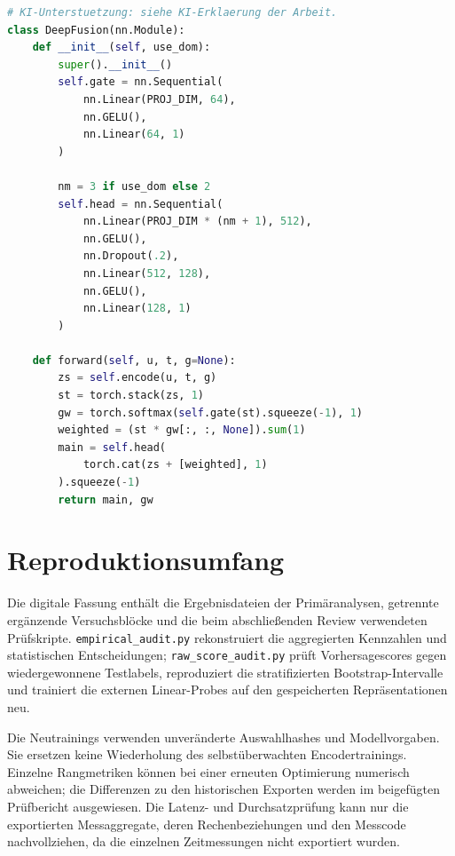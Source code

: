 \par\medskip\noindent\begin{minipage}{\dimexpr\linewidth-1em\relax}
\begin{lstlisting}[language=Python,caption={Kern der multimodalen DUAL-/TRI-Fusion -- gekürzter Architekturausschnitt},label={lst:deep_fusion}]
# KI-Unterstuetzung: siehe KI-Erklaerung der Arbeit.
class DeepFusion(nn.Module):
    def __init__(self, use_dom):
        super().__init__()
        self.gate = nn.Sequential(
            nn.Linear(PROJ_DIM, 64),
            nn.GELU(),
            nn.Linear(64, 1)
        )

        nm = 3 if use_dom else 2
        self.head = nn.Sequential(
            nn.Linear(PROJ_DIM * (nm + 1), 512),
            nn.GELU(),
            nn.Dropout(.2),
            nn.Linear(512, 128),
            nn.GELU(),
            nn.Linear(128, 1)
        )

    def forward(self, u, t, g=None):
        zs = self.encode(u, t, g)
        st = torch.stack(zs, 1)
        gw = torch.softmax(self.gate(st).squeeze(-1), 1)
        weighted = (st * gw[:, :, None]).sum(1)
        main = self.head(
            torch.cat(zs + [weighted], 1)
        ).squeeze(-1)
        return main, gw
\end{lstlisting}
\end{minipage}\par\medskip

\section{Reproduktionsumfang}
Die digitale Fassung enthält die Ergebnisdateien der Primäranalysen, getrennte ergänzende
Versuchsblöcke und die beim abschließenden Review verwendeten Prüfskripte.
\nolinkurl{empirical_audit.py} rekonstruiert die aggregierten Kennzahlen und statistischen
Entscheidungen; \nolinkurl{raw_score_audit.py} prüft Vorhersagescores gegen wiedergewonnene
Testlabels, reproduziert die stratifizierten Bootstrap-Intervalle und trainiert die
externen Linear-Probes auf den gespeicherten Repräsentationen neu.

Die Neutrainings verwenden unveränderte Auswahlhashes und Modellvorgaben. Sie ersetzen
keine Wiederholung des selbstüberwachten Encodertrainings. Einzelne Rangmetriken können
bei einer erneuten Optimierung numerisch abweichen; die Differenzen zu den historischen
Exporten werden im beigefügten Prüfbericht ausgewiesen. Die Latenz- und Durchsatzprüfung
kann nur die exportierten Messaggregate, deren Rechenbeziehungen und den Messcode
nachvollziehen, da die einzelnen Zeitmessungen nicht exportiert wurden.
